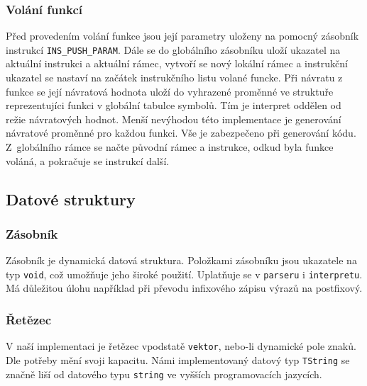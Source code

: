 \documentclass[a4paper, 12pt]{article}
\begin{document}
\subsubsection{Volání funkcí}
Před provedením volání funkce jsou její parametry uloženy na pomocný zásobník
instrukcí \texttt{INS\_PUSH\_PARAM}. Dále se do globálního zásobníku uloží
ukazatel na aktuální instrukci a aktuální rámec, vytvoří se nový lokální rámec
a instrukční ukazatel se nastaví na začátek instrukčního listu volané funcke.
Při návratu z funkce se její návratová hodnota uloží do vyhrazené
proměnné ve struktuře reprezentujíci funkci v globální tabulce symbolů.
Tím je interpret oddělen od režie návratových hodnot. Menší nevýhodou této
implementace je generování návratové proměnné pro každou funkci.
Vše je zabezpečeno při generování kódu. Z~globálního rámce se načte původní
rámec a instrukce, odkud byla funkce voláná, a pokračuje se instrukcí další.

\newpage

\subsection{Datové struktury}

\subsubsection{Zásobník}
Zásobník je dynamická datová struktura. Položkami zásobníku jsou ukazatele
na typ \texttt{void}, což umožňuje jeho široké použití.
Uplatňuje se v \texttt{parseru} i \texttt{interpretu}. Má důležitou úlohu
například při převodu infixového zápisu výrazů na postfixový.

\subsubsection{Řetězec}
V naší implementaci je řetězec vpodstatě \texttt{vektor}, nebo-li dynamické pole znaků.
Dle potřeby mění svoji kapacitu. Námi implementovaný datový typ \texttt{TString}
se značně liší od datového typu \texttt{string} ve vyšších programovacích
jazycích.
\end{document}
